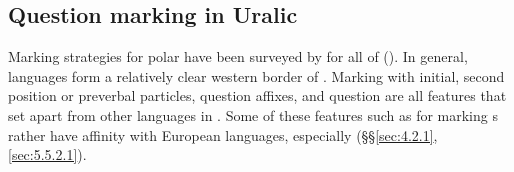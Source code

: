 \subsection{Question marking in Uralic}\label{sec:5.12.2}

Marking strategies for polar  have been surveyed by \citet{Miestamo2011} for all of  (). In general,  languages form a relatively clear western border of . Marking with initial, second position or preverbal particles, question affixes, and question  are all features that set  apart from other languages in . Some of these features such as  for marking s rather have affinity with European languages, especially  (§§\ref{sec:4.2.1}, \ref{sec:5.5.2.1}).

